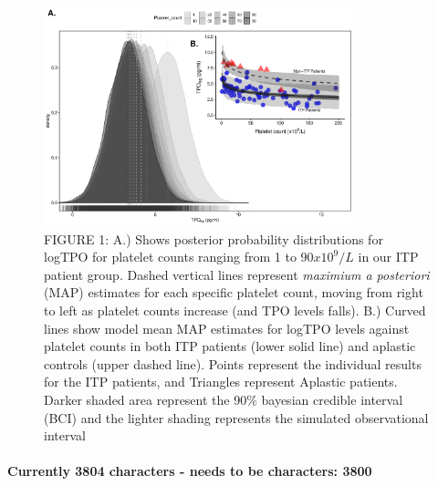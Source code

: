 \documentclass[11pt]{article}
\begin{document}

\begin{figure}
\includegraphics[width=0.8\textwidth]{ABS_v4_g1.pdf}
\caption {FIGURE 1: A.) Shows posterior probability distributions for logTPO for platelet counts ranging from 1 to 90$x10^9/L$ in our ITP patient group. Dashed vertical lines represent \textit{maximium a posteriori} (MAP) estimates for each specific platelet count, moving from right to left as platelet counts increase (and TPO levels falls). B.) Curved lines show model mean MAP estimates for logTPO levels against platelet counts in both ITP patients (lower solid line) and aplastic controls (upper dashed line). Points represent the individual results for the ITP patients, and Triangles represent Aplastic patients. Darker shaded area represent the 90\% bayesian credible interval (BCI) and the lighter shading represents the simulated observational interval}
\end{figure}





\paragraph{}
\textbf{Currently 3804 characters - needs to be characters: 3800}
\end{document}
